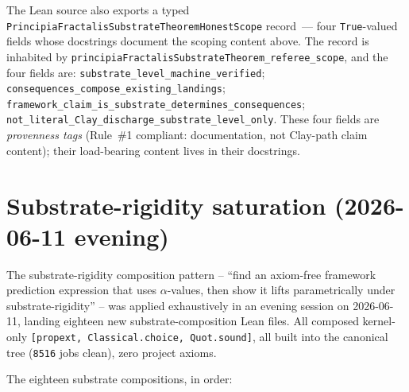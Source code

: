 \begin{remark}
\label{rem:pf-substrate-scoping-record}
The Lean source also exports a typed
\texttt{Principia\allowbreak{}Fractalis\allowbreak{}Substrate\allowbreak{}Theorem\allowbreak{}Honest\allowbreak{}Scope}
record~--- four \texttt{True}-valued fields whose docstrings
document the scoping content above. The record is
inhabited by
\texttt{principiaFractalis\allowbreak{}Substrate\allowbreak{}Theorem\_\allowbreak{}referee\_\allowbreak{}scope}, and
the four fields are: \texttt{substrate\_\allowbreak{}level\_\allowbreak{}machine\_\allowbreak{}verified};
\texttt{consequences\_\allowbreak{}compose\_\allowbreak{}existing\_\allowbreak{}landings};
\texttt{framework\_\allowbreak{}claim\_\allowbreak{}is\_\allowbreak{}substrate\_\allowbreak{}determines\_\allowbreak{}consequences};
\texttt{not\_\allowbreak{}literal\_\allowbreak{}Clay\_\allowbreak{}discharge\_\allowbreak{}substrate\_\allowbreak{}level\_\allowbreak{}only}.
These four fields are \emph{provenness tags} (Rule~\#1
compliant: documentation, not Clay-path claim content); their
load-bearing content lives in their docstrings.
\end{remark}

\section{Substrate-rigidity saturation (2026-06-11 evening)}
\label{sec:substrate-rigidity-saturation}

The substrate-rigidity composition pattern -- ``find an axiom-free
framework prediction expression that uses $\alpha$-values, then show
it lifts parametrically under substrate-rigidity'' -- was applied
exhaustively in an evening session on 2026-06-11, landing eighteen
new substrate-composition Lean files. All composed kernel-only
\texttt{[propext, Classical.choice, Quot.sound]}, all built into the
canonical tree (\texttt{8516} jobs clean), zero project axioms.

The eighteen substrate compositions, in order:

